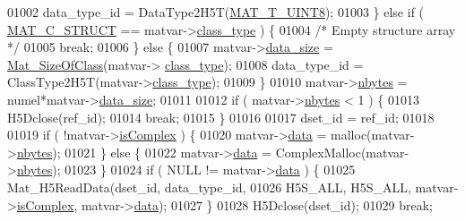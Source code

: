 \begin{DoxyCode}
01002                 data\_type\_id      = DataType2H5T(\hyperlink{group___m_a_t_ggacf7b3b879282b7ab3a51190e49bf3453a01c1bd7db68f90552862eb5d311be408}{MAT\_T\_UINT8});
01003             \} \textcolor{keywordflow}{else} \textcolor{keywordflow}{if} ( \hyperlink{group___m_a_t_ggad4d60ae7b709fc81bfd744fb4c857c40acb467c7749c80902b798134c729bb521}{MAT\_C\_STRUCT} == matvar->\hyperlink{group___m_a_t_aff13035bf3265dd7d9425e5d40c839d4}{class\_type} ) \{
01004                 \textcolor{comment}{/* Empty structure array */}
01005                 \textcolor{keywordflow}{break};
01006             \} \textcolor{keywordflow}{else} \{
01007                 matvar->\hyperlink{group___m_a_t_a9ad1c82e2b568da617e12dc73a26e1f9}{data\_size} = \hyperlink{group___m_a_t_ga2bf682f015b22fa796a8885e997661e7}{Mat\_SizeOfClass}(matvar->
      \hyperlink{group___m_a_t_aff13035bf3265dd7d9425e5d40c839d4}{class\_type});
01008                 data\_type\_id      = ClassType2H5T(matvar->\hyperlink{group___m_a_t_aff13035bf3265dd7d9425e5d40c839d4}{class\_type});
01009             \}
01010             matvar->\hyperlink{group___m_a_t_abf1c844540503be2df9bb3db93cfe307}{nbytes} = numel*matvar->\hyperlink{group___m_a_t_a9ad1c82e2b568da617e12dc73a26e1f9}{data\_size};
01011 
01012             \textcolor{keywordflow}{if} ( matvar->\hyperlink{group___m_a_t_abf1c844540503be2df9bb3db93cfe307}{nbytes} < 1 ) \{
01013                 H5Dclose(ref\_id);
01014                 \textcolor{keywordflow}{break};
01015             \}
01016 
01017             dset\_id = ref\_id;
01018 
01019             \textcolor{keywordflow}{if} ( !matvar->\hyperlink{group___m_a_t_aeb03b3a69f108dc05470b00443a43739}{isComplex} ) \{
01020                 matvar->\hyperlink{group___m_a_t_a5672978efa230bbdecdf38ede781f7fa}{data} = malloc(matvar->\hyperlink{group___m_a_t_abf1c844540503be2df9bb3db93cfe307}{nbytes});
01021             \} \textcolor{keywordflow}{else} \{
01022                 matvar->\hyperlink{group___m_a_t_a5672978efa230bbdecdf38ede781f7fa}{data} = ComplexMalloc(matvar->\hyperlink{group___m_a_t_abf1c844540503be2df9bb3db93cfe307}{nbytes});
01023             \}
01024             \textcolor{keywordflow}{if} ( NULL != matvar->\hyperlink{group___m_a_t_a5672978efa230bbdecdf38ede781f7fa}{data} ) \{
01025                 Mat\_H5ReadData(dset\_id, data\_type\_id,
01026                     H5S\_ALL, H5S\_ALL, matvar->\hyperlink{group___m_a_t_aeb03b3a69f108dc05470b00443a43739}{isComplex}, matvar->\hyperlink{group___m_a_t_a5672978efa230bbdecdf38ede781f7fa}{data});
01027             \}
01028             H5Dclose(dset\_id);
01029             \textcolor{keywordflow}{break};

\end{DoxyCode}
